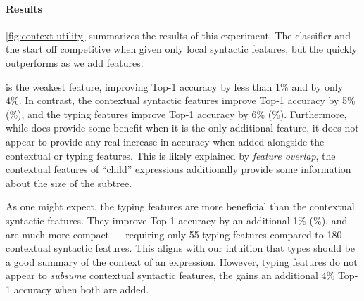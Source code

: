 %
\paragraph{Results}
\autoref{fig:context-utility} summarizes the results of this experiment.
%
The \linear classifier and the \hiddenFH start off
competitive when given only local syntactic features, but the \hiddenFH
quickly outperforms as we add features.

\ExprSize is the weakest feature, improving \linear Top-1
accuracy by less than 1\% and \hiddenFH by only 4\%.
%
In contrast, the contextual syntactic features improve \linear Top-1
accuracy by 5\% (\%), and the typing features improve
Top-1 accuracy by 6\% (\%).
%
Furthermore, while \ExprSize does provide some benefit when it is the
only additional feature, it does not appear to provide any real increase
in accuracy when added alongside the contextual or typing features.
%
This is likely explained by \emph{feature overlap}, \ie the contextual
features of ``child'' expressions additionally provide some information
about the size of the subtree.

As one might expect, the typing features are more beneficial than the
contextual syntactic features.
%
They improve Top-1 accuracy by an additional 1\% (\%), and are much more
compact --- requiring only 55 typing features compared to 180
contextual syntactic features.
%
This aligns with our intuition that types should be a good summary of
the context of an expression.
%
However, typing features do not appear to \emph{subsume} contextual
syntactic features, the \hiddenFH gains an additional 4\% Top-1 accuracy
when both are added.

